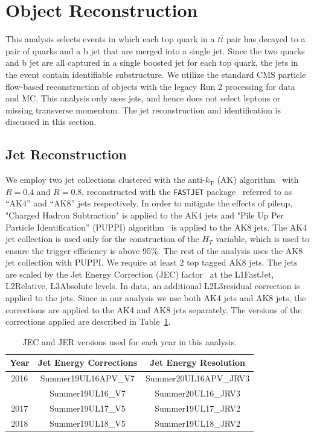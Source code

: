 \section{Object Reconstruction}
\label{sec:reco}

This analysis selects events in which each top quark in a $t\bar{t}$ pair has decayed to a pair of quarks and a b jet that are merged into a single jet. Since the two quarks and b jet are all captured in a single boosted jet for each top quark, the jets in the event contain identifiable substructure. We utilize the standard CMS particle flow-based reconstruction of objects with the legacy Run 2 processing for data and MC. This analysis only uses jets, and hence does not select leptons or missing transverse momentum. The jet reconstruction and identification is discussed in this section.


\subsection{Jet Reconstruction}
\label{sec:jetreco}

We employ two jet collections clustered with the anti-$k_{\mathrm{T}}$ (AK) algorithm~\cite{antikt} with $R=0.4$ and $R=0.8$, reconstructed with the {\tt FASTJET} package~\cite{fastjet} referred to as ``AK4'' and ``AK8'' jets respectively. In order to mitigate the effects of pileup, "Charged Hadron Subtraction" is applied to the AK4 jets and "Pile Up Per Particle Identification'' (PUPPI) algorithm~\cite{puppi} is applied to the AK8 jets. The AK4 jet collection is used only for the construction of the $H_T$ variable, which is used to ensure the trigger efficiency is above 95\%. The rest of the analysis uses the AK8 jet collection with PUPPI. We require at least 2 top tagged AK8 jets. The jets are scaled by the Jet Energy Correction (JEC) factor~\cite{CMS:JEC} at the L1FastJet, L2Relative, L3Absolute levels. In data, an additional L2L3residual correction is applied to the jets. Since in our analysis we use both AK4 jets and AK8 jets, the corrections are applied to the AK4 and AK8 jets separately. The versions of the corrections applied are described in Table~\ref{tab:jerc}.


\begin{table}[!h]
	\centering
	\begin{tabular}{|ccc|} \hline
		Year       &  Jet Energy Corrections  &  Jet Energy Resolution   \\ \hline
		2016    &  Summer19UL16APV\_V7     &  Summer20UL16APV\_JRV3      \\
		&  Summer19UL16\_V7        &  Summer20UL16\_JRV3      \\
		2017         &  Summer19UL17\_V5        &  Summer19UL17\_JRV2   \\
		2018         &  Summer19UL18\_V5        &  Summer19UL18\_JRV2   \\\hline
	\end{tabular}
	\caption{JEC and JER versions used for each year in this analysis.}
	\label{tab:jerc}
\end{table}


